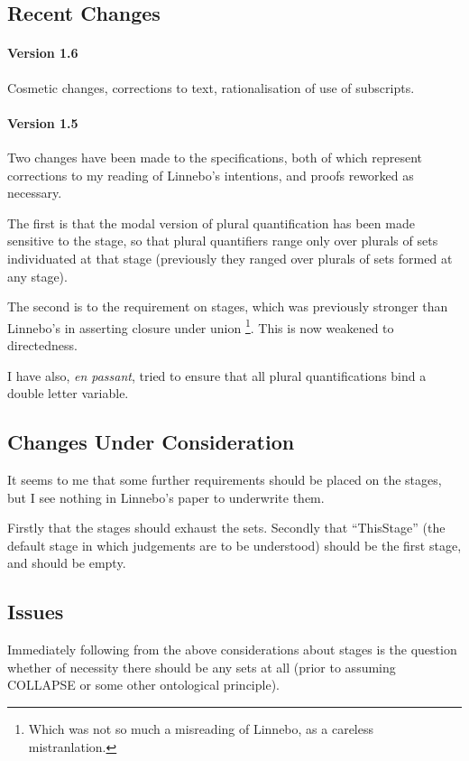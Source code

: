 \documentclass[11pt]{article}
\begin{document}
\subsection{Recent Changes}

\paragraph{Version 1.6}

Cosmetic changes, corrections to text, rationalisation of use of subscripts.

\paragraph{Version 1.5}

Two changes have been made to the specifications, both of which represent corrections to my reading of Linnebo's intentions, and proofs reworked as necessary.

The first is that the modal version of plural quantification has been made sensitive to the stage, so that plural quantifiers range only over plurals of sets individuated at that stage (previously they ranged over plurals of sets formed at any stage).

The second is to the requirement on stages, which was previously stronger than Linnebo's in asserting closure under union%
\footnote{Which was not so much a misreading of Linnebo, as a careless mistranlation.}.
This is now weakened to directedness.

I have also, \emph{en passant}, tried to ensure that all plural quantifications bind a double letter variable.

\subsection{Changes Under Consideration}

It seems to me that some further requirements should be placed on the stages, but I see nothing in Linnebo's paper to underwrite them.

Firstly that the stages should exhaust the sets.
Secondly that ``ThisStage'' (the default stage in which judgements are to be understood) should be the first stage, and should be empty.

\subsection{Issues}

Immediately following from the above considerations about stages is the question whether of necessity there should be any sets at all (prior to assuming COLLAPSE or some other ontological principle).
\end{document}

